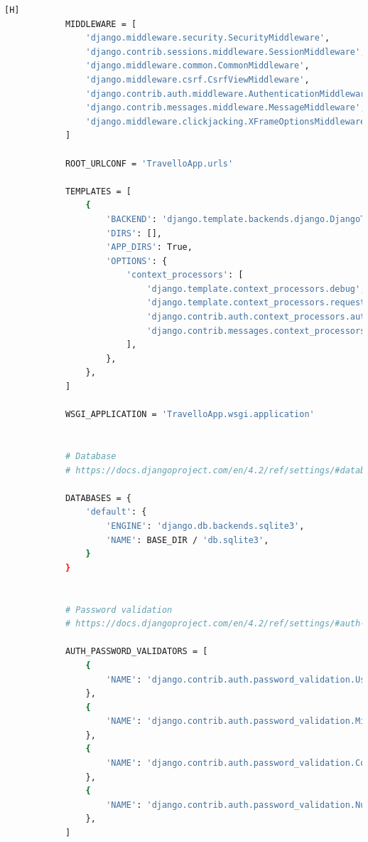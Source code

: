 \documentclass{article}
\begin{document}
\begin{lstlisting}[language=bash,caption={urls.py}][H]
            MIDDLEWARE = [
                'django.middleware.security.SecurityMiddleware',
                'django.contrib.sessions.middleware.SessionMiddleware',
                'django.middleware.common.CommonMiddleware',
                'django.middleware.csrf.CsrfViewMiddleware',
                'django.contrib.auth.middleware.AuthenticationMiddleware',
                'django.contrib.messages.middleware.MessageMiddleware',
                'django.middleware.clickjacking.XFrameOptionsMiddleware',
            ]
            
            ROOT_URLCONF = 'TravelloApp.urls'
            
            TEMPLATES = [
                {
                    'BACKEND': 'django.template.backends.django.DjangoTemplates',
                    'DIRS': [],
                    'APP_DIRS': True,
                    'OPTIONS': {
                        'context_processors': [
                            'django.template.context_processors.debug',
                            'django.template.context_processors.request',
                            'django.contrib.auth.context_processors.auth',
                            'django.contrib.messages.context_processors.messages',
                        ],
                    },
                },
            ]
            
            WSGI_APPLICATION = 'TravelloApp.wsgi.application'
            
            
            # Database
            # https://docs.djangoproject.com/en/4.2/ref/settings/#databases
            
            DATABASES = {
                'default': {
                    'ENGINE': 'django.db.backends.sqlite3',
                    'NAME': BASE_DIR / 'db.sqlite3',
                }
            }
            
            
            # Password validation
            # https://docs.djangoproject.com/en/4.2/ref/settings/#auth-password-validators
            
            AUTH_PASSWORD_VALIDATORS = [
                {
                    'NAME': 'django.contrib.auth.password_validation.UserAttributeSimilarityValidator',
                },
                {
                    'NAME': 'django.contrib.auth.password_validation.MinimumLengthValidator',
                },
                {
                    'NAME': 'django.contrib.auth.password_validation.CommonPasswordValidator',
                },
                {
                    'NAME': 'django.contrib.auth.password_validation.NumericPasswordValidator',
                },
            ]
            

\end{lstlisting}
\end{document}

